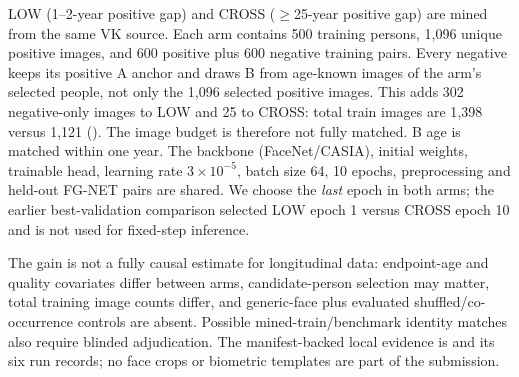 \documentclass[journal]{IEEEtran}
\begin{document}
LOW (1--2-year positive gap) and CROSS ($\geq$25-year positive gap) are mined from
the same VK source. Each arm contains 500 training persons, 1{,}096 unique
positive images, and 600 positive plus 600 negative training pairs. Every
negative keeps its positive A anchor and draws B from age-known images of the
arm's selected people, not only the 1{,}096 selected positive images. This adds
302 negative-only images to LOW and 25 to CROSS: total train images are
1{,}398 versus 1{,}121 ().
The image budget is therefore not fully matched. B age is matched within one year.
The backbone (FaceNet/CASIA), initial weights,
trainable head, learning rate $3\times10^{-5}$, batch size 64, 10 epochs,
preprocessing and held-out FG-NET pairs are shared. We choose the \emph{last}
epoch in both arms; the earlier best-validation comparison selected LOW epoch 1
versus CROSS epoch 10 and is not used for fixed-step inference.

\begin{table}[!t]
\caption{Historical fixed-epoch VK LOW/CROSS control with unequal full image budgets; not the replacement experiment below. Endpoint-age-matched FG-NET
25+ protocol (215 positive/215 negative pairs, 75 subjects). CIs resample
subjects on both sides of a pair; all seeds reuse the same people.}
\label{tab:matched-source}
\centering
\footnotesize
{}
\end{table}

The gain is not a fully causal estimate for longitudinal data: endpoint-age
and quality covariates differ between arms, candidate-person selection may
matter, total training image counts differ, and generic-face plus evaluated
shuffled/co-occurrence controls are absent. Possible mined-train/benchmark identity matches
also require blinded adjudication. The manifest-backed local evidence is
 and its six run
records; no face crops or biometric templates are part of the submission.
\end{document}
